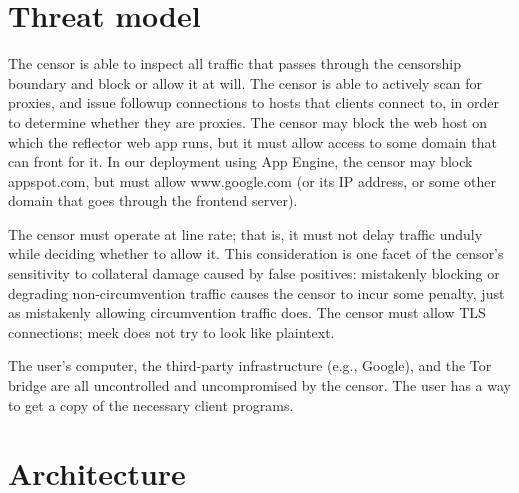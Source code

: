 \documentclass{article}
\begin{document}

\section{Threat model}

The censor is able to inspect all traffic that passes through
the censorship boundary and block or allow it at will.
The censor is able to actively scan for proxies, and issue followup
connections to hosts that clients connect to, in order to determine
whether they are proxies.
The censor may block the web host on which the reflector web app runs,
but it must allow access to some domain that can front for it.
In our deployment using App Engine, the censor may block appspot.com,
but must allow www.google.com (or its IP address, or some other domain
that goes through the frontend server).

The censor must operate at line rate; that is,
it must not delay traffic unduly while deciding whether to allow it.
This consideration is one facet of the censor's sensitivity to
collateral damage caused by false positives:
mistakenly blocking or degrading non-circumvention traffic causes the censor
to incur some penalty, just as mistakenly allowing circumvention traffic does.
The censor must allow TLS connections; meek does not try to look like plaintext.

The user's computer, the third-party infrastructure (e.g., Google), and the Tor bridge
are all uncontrolled and uncompromised by the censor.
The user has a way to get a copy of the necessary client programs.

\section{Architecture}
\end{document}
